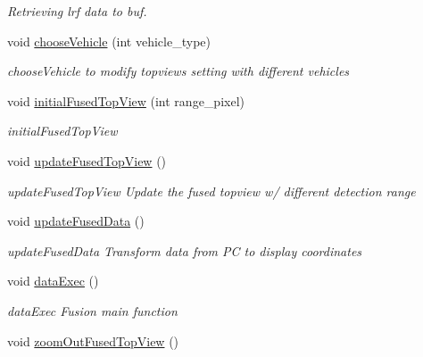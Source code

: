\begin{DoxyCompactItemize}
\begin{DoxyCompactList}\small\item\em Retrieving lrf data to buf. \end{DoxyCompactList}\item 
void \hyperlink{class_sensor_info_adf375036103c9b7e3a3bf10b472ca6be}{choose\+Vehicle} (int vehicle\+\_\+type)
\begin{DoxyCompactList}\small\item\em choose\+Vehicle to modify topview\textquotesingle{}s setting with different vehicles \end{DoxyCompactList}\item 
void \hyperlink{class_sensor_info_aa8031ea5907d5822d21d964044ac6f11}{initial\+Fused\+Top\+View} (int range\+\_\+pixel)
\begin{DoxyCompactList}\small\item\em initial\+Fused\+Top\+View \end{DoxyCompactList}\item 
\hypertarget{class_sensor_info_a949ffd6e8141a1ea36a81daf18773bbe}{}void \hyperlink{class_sensor_info_a949ffd6e8141a1ea36a81daf18773bbe}{update\+Fused\+Top\+View} ()\label{class_sensor_info_a949ffd6e8141a1ea36a81daf18773bbe}

\begin{DoxyCompactList}\small\item\em update\+Fused\+Top\+View Update the fused topview w/ different detection range \end{DoxyCompactList}\item 
void \hyperlink{class_sensor_info_a84c1404a225b5795af3b8383753daf2a}{update\+Fused\+Data} ()
\begin{DoxyCompactList}\small\item\em update\+Fused\+Data Transform data from P\+C to display coordinates \end{DoxyCompactList}\item 
\hypertarget{class_sensor_info_aeeb4f996917547ec595735a593123fb2}{}void \hyperlink{class_sensor_info_aeeb4f996917547ec595735a593123fb2}{data\+Exec} ()\label{class_sensor_info_aeeb4f996917547ec595735a593123fb2}

\begin{DoxyCompactList}\small\item\em data\+Exec Fusion main function \end{DoxyCompactList}\item 
\hypertarget{class_sensor_info_abdf7ecd5f4cfdc2ebe9dadaf3723339f}{}void \hyperlink{class_sensor_info_abdf7ecd5f4cfdc2ebe9dadaf3723339f}{zoom\+Out\+Fused\+Top\+View} ()\label{class_sensor_info_abdf7ecd5f4cfdc2ebe9dadaf3723339f}


\end{DoxyCompactItemize}
